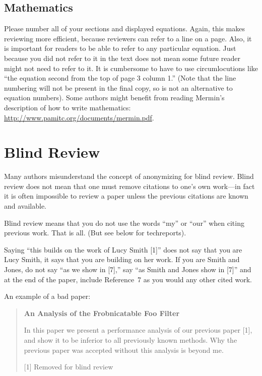 \documentclass[runningheads]{llncs}
\begin{document}
\subsection{Mathematics}

Please number all of your sections and displayed equations.  Again,
this makes reviewing more efficient, because reviewers can refer to a
line on a page.  Also, it is important for readers to be able to refer
to any particular equation.  Just because you did not refer to it in
the text does not mean some future reader might not need to refer to
it.  It is cumbersome to have to use circumlocutions like ``the
equation second from the top of page 3 column 1.''  (Note that the
line numbering will not be present in the final copy, so is not an
alternative to equation numbers).  Some authors might benefit from
reading Mermin's description of how to write mathematics:
\url{http://www.pamitc.org/documents/mermin.pdf}.

\section{Blind Review}
\label{sec:blind}

Many authors misunderstand the concept of anonymizing for blind
review.  Blind review does not mean that one must remove
citations to one's own work---in fact it is often impossible to
review a paper unless the previous citations are known and
available.

Blind review means that you do not use the words ``my'' or ``our''
when citing previous work.  That is all.  (But see below for 
techreports).

Saying ``this builds on the work of Lucy Smith [1]'' does not say
that you are Lucy Smith, it says that you are building on her
work.  If you are Smith and Jones, do not say ``as we show in
[7],'' say ``as Smith and Jones show in [7]'' and at the end of the
paper, include Reference~7 as you would any other cited work.

An example of a bad paper:
\begin{quote}
\begin{center}
    {\bf An Analysis of the Frobnicatable Foo Filter}
\end{center}
   
   In this paper we present a performance analysis of our
   previous paper [1], and show it to be inferior to all
   previously known methods.  Why the previous paper was
   accepted without this analysis is beyond me.
   
   [1] Removed for blind review
\end{quote}
   
\end{document}
